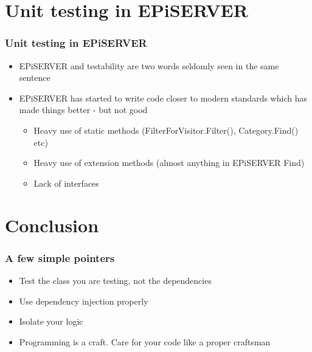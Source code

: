 \documentclass{beamer}
\begin{document}
		\section{Unit testing in EPiSERVER}
		\begin{frame}
			\frametitle{Unit testing in EPiSERVER} \pause
			\begin{itemize}
				\item EPiSERVER and testability are two words seldomly seen in the same sentence \pause
				\item EPiSERVER has started to write code closer to modern standards which has made things better - but not good  \pause
				\begin{itemize}
					\item Heavy use of static methods (FilterForVisitor.Filter(), Category.Find() etc) \pause
					\item Heavy use of extension methods (almost anything in EPiSERVER Find) \pause
					\item Lack of interfaces
				\end{itemize}
			\end{itemize}
		\end{frame}

		\section{Conclusion}
		\begin{frame}
			\frametitle{A few simple pointers} \pause
			\begin{itemize}
				\item Test the class you are testing, not the dependencies \pause
				\item Use dependency injection properly \pause
				\item Isolate your logic \pause
				\item Programming is a craft. Care for your code like a proper craftsman 
			\end{itemize}
		\end{frame}
\end{document}
